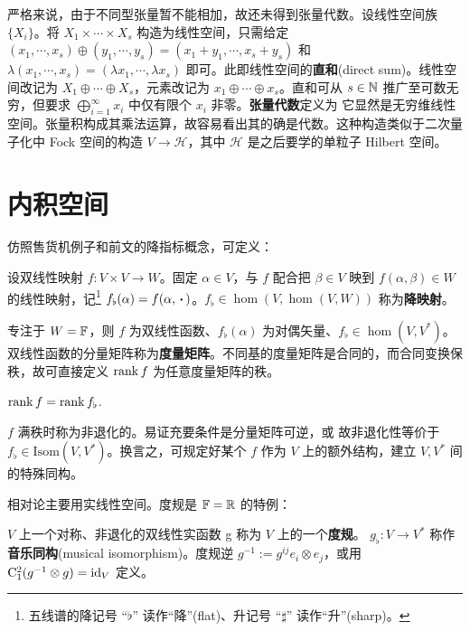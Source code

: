 严格来说，由于不同型张量暂不能相加，故还未得到张量代数。设线性空间族 $\{X_i\}$。将 $X_1\times\cdots\times X_s$ 构造为线性空间，只需给定 $(x_1,\cdots,x_s)\oplus(y_1,\cdots,y_s)=(x_1+y_1,\cdots,x_s+y_s)$ 和 $\lambda(x_1,\cdots,x_s)=(\lambda x_1,\cdots,\lambda x_s)$ 即可。此即线性空间的\textbf{直和}(direct sum)。线性空间改记为 $X_1\oplus\cdots\oplus X_s$，元素改记为 $x_1\oplus\cdots\oplus x_s$。直和可从 $s\in\mathbb{N}$ 推广至可数无穷，但要求 $\bigoplus_{i=1}^\infty x_i$ 中仅有限个 $x_i$ 非零。\textbf{张量代数}定义为
它显然是无穷维线性空间。张量积构成其乘法运算，故容易看出其的确是代数。这种构造类似于二次量子化中 Fock 空间的构造 $V\to\mathscr H$，其中 $\mathscr H$ 是之后要学的单粒子 Hilbert 空间。

\section{内积空间}

仿照售货机例子和前文的降指标概念，可定义：

\begin{definition}
    设双线性映射 $f:V\times V\to W$。固定 $\alpha\in V$，与 $f$ 配合把 $\beta\in V$ 映到 $f(\alpha,\beta)\in W$ 的线性映射，记\footnote{五线谱的降记号 “$\flat$” 读作“降”(flat)、升记号 “$\sharp$” 读作“升”(sharp)。} $f_\flat(\alpha)=f(\alpha,\oo)$。$f_\flat\in\hom(V,\hom(V,W))$ 称为\textbf{降映射}。
\end{definition}


专注于 $W=\mathbb{F}$，则 $f$ 为双线性函数、$f_\flat(\alpha)$ 为对偶矢量、$f_\flat\in\hom(V,V^*)$。
双线性函数的分量矩阵称为\textbf{度量矩阵}。不同基的度量矩阵是合同的，而合同变换保秩，故可直接定义 $\rank f$ 为任意度量矩阵的秩。

\begin{theorem}
    $\rank f=\rank f_\flat$.
\end{theorem}

$f$ 满秩时称为非退化的。易证充要条件是分量矩阵可逆，或
故非退化性等价于 $f_\flat\in\mathrm{Isom}(V,V^*)$。换言之，可规定好某个 $f$ 作为 $V$ 上的额外结构，建立 $V,V^*$ 间的特殊同构。

相对论主要用实线性空间。度规是 $\mathbb{F}=\mathbb{R}$ 的特例：

\begin{definition}
    $V$ 上一个对称、非退化的双线性实函数 g 称为 $V$ 上的一个\textbf{度规}。 $g_\flat:V\to V^*$ 称作\textbf{音乐同构}(musical isomorphism)。度规逆 $g^{-1}:=g^{ij} e_i\otimes e_j$，或用 $\mathrm{C}_1^2(g^{-1}\otimes g)=\mathrm{id}_V$ 定义。
\end{definition}

